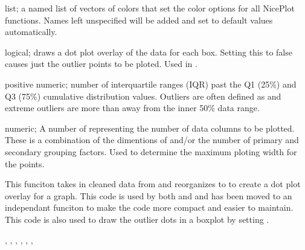 \documentclass[a4paper]{book}
\begin{document}
\begin{Arguments}
\begin{ldescription}
\item[\code{plotColors}] list; a named list of vectors of colors that set the color options for all NicePlot functions. Names left unspecified will be added and set to default values automatically.

\item[\code{drawPoints}] logical; draws a dot plot overlay of the data for each box. Setting this to false causes just the outlier points to be ploted. Used in .

\item[\code{outliers}] positive numeric; number of interquartile ranges (IQR) past the Q1 (25\%) and Q3 (75\%) cumulative distribution values. Outliers are often defined as  and extreme outliers are more than  away from the inner 50\% data range.

\item[\code{dataCols}] numeric; A number of representing the number of data columns to be plotted. These is a combination of the dimentions of  and/or the number of primary and secondary grouping factors. Used to determine the maximum ploting width for the points.
\end{ldescription}
\end{Arguments}
%
\begin{Details}\relax
This funciton takes in cleaned data from  and reorganizes to to create a dot plot overlay for a graph.
This code is used by both  and  and has been moved to an independant funciton to make the code more compact and easier to maintain.
This code is also used to draw the outlier dots in a boxplot by setting .
\end{Details}
%
\begin{SeeAlso}\relax
{}, , , , , , 
\end{SeeAlso}
%
\begin{Examples}
\end{Examples}
\end{document}
